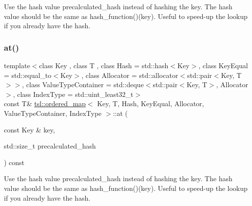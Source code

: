 Use the hash value \textquotesingle{}precalculated\+\_\+hash\textquotesingle{} instead of hashing the key. The hash value should be the same as hash\+\_\+function()(key). Useful to speed-\/up the lookup if you already have the hash. \mbox{\label{classtsl_1_1ordered__map_a678118593d6aba4f173a65c83859d8f6}} 
\subsubsection{\texorpdfstring{at()}{at()}\hspace{0.1cm}{\footnotesize\ttfamily [2/6]}}
{\footnotesize\ttfamily template$<$class Key , class T , class Hash  = std\+::hash$<$\+Key$>$, class Key\+Equal  = std\+::equal\+\_\+to$<$\+Key$>$, class Allocator  = std\+::allocator$<$std\+::pair$<$\+Key, T$>$$>$, class Value\+Type\+Container  = std\+::deque$<$std\+::pair$<$\+Key, T$>$, Allocator$>$, class Index\+Type  = std\+::uint\+\_\+least32\+\_\+t$>$ \\
const T\& \mbox{\hyperlink{classtsl_1_1ordered__map}{tsl\+::ordered\+\_\+map}}$<$ Key, T, Hash, Key\+Equal, Allocator, Value\+Type\+Container, Index\+Type $>$\+::at (\begin{DoxyParamCaption}\item[{const Key \&}]{key,  }\item[{std\+::size\+\_\+t}]{precalculated\+\_\+hash }\end{DoxyParamCaption}) const\hspace{0.3cm}{\ttfamily [inline]}}





Use the hash value \textquotesingle{}precalculated\+\_\+hash\textquotesingle{} instead of hashing the key. The hash value should be the same as hash\+\_\+function()(key). Useful to speed-\/up the lookup if you already have the hash. \mbox{\label{classtsl_1_1ordered__map_a9ac22985f53d62c53617932cd54493cf}} 
